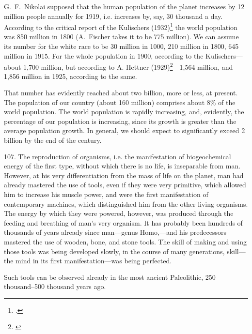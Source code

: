G.~F.\ Nikolai supposed that the human population of the planet increases by 12
million people annually for 1919, i.e. increases by, say, 30 thousand a day.
According to the critical report of the Kulischers
(1932)\footnote{\cite{kulischer1932kriegs-p135}.} the world population was 850
million in 1800 (A.~Fischer takes it to be 775 million).  We can assume its
number for the white race to be 30 million in 1000, 210 million in 1800, 645
million in 1915.  For the whole population in 1900, according to the
Kulischers---about 1,700 million, but according to A.  Hettner
(1929)\footnote{\cite{hettner1929gang-p196}}---1,564 million, and 1,856 million
in 1925, according to the same.

That number has evidently reached about two billion, more or less, at present.
The population of our country (about 160 million) comprises about 8\% of the
world population.  The world population is rapidly increasing, and, evidently,
the percentage of our population is increasing, since its growth is greater
than the average population growth.  In general, we should expect to
significantly exceed 2 billion by the end of the century.


107. The reproduction of organisms, i.e. the manifestation of biogeochemical
energy of the first type, without which there is no life, is inseparable from
man.  However, at his very differentiation from the mass of life on the
planet, man had already mastered the use of tools, even if they were very
primitive, which allowed him to increase his muscle power, and were the first
manifestation of contemporary machines, which distinguished him from the other
living organisms.  The energy by which they were powered, however, was
produced through the feeding and breathing of man's very organism.  It has
probably been hundreds of thousands of years already since man---genus
Homo,---and his predecessors mastered the use of wooden, bone, and stone
tools.  The skill of making and using those tools was being developed slowly,
in the course of many generations, skill---the mind in its first
manifestation---was being perfected.

Such tools can be observed already in the most ancient Paleolithic, 250
thousand--500 thousand years ago.


